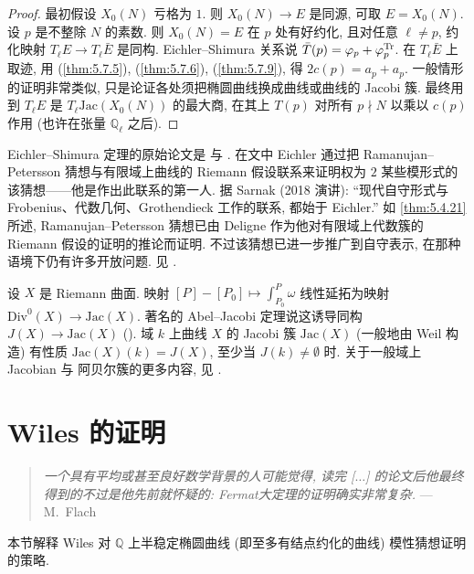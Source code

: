 \begin{proof}
最初假设 $X_0(N)$ 亏格为 $1$. 则 $X_0(N)\to E$ 是同源, 可取 $E = X_0(N)$. 设 $p$ 是不整除 $N$ 的素数. 则 $X_0(N) = E$ 在 $p$ 处有好约化, 且对任意 $\ell\neq p$, 约化映射 $T_\ell E\to T_\ell\bar{E}$ 是同构. Eichler--Shimura 关系说 $\bar{T}(p) = \varphi_p + \varphi_p^{\operatorname{Tr}}$. 在 $T_\ell\bar{E}$ 上取迹, 用 (\ref{thm:5.7.5}), (\ref{thm:5.7.6}), (\ref{thm:5.7.9}), 得 $2c(p) = a_p + a_p$. 一般情形的证明非常类似, 只是论证各处须把椭圆曲线换成曲线或曲线的 Jacobi 簇. 最终用到 $T_\ell E$ 是 $T_\ell\mathrm{Jac}(X_0(N))$ 的最大商, 在其上 $T(p)$ 对所有 $p\nmid N$ 以乘以 $c(p)$ 作用 (也许在张量 $\mathbb{Q}_\ell$ 之后).
\end{proof}

\begin{aside} \label{thm:5.7.11} 
Eichler--Shimura 定理的原始论文是 \cite{eichler1954} 与 \cite{shimura1958}. 在文中 Eichler 通过把 Ramanujan--Petersson 猜想与有限域上曲线的 Riemann 假设联系来证明权为 $2$ 某些模形式的该猜想——他是作出此联系的第一人. 据 Sarnak (2018 演讲): ``现代自守形式与 Frobenius、代数几何、Grothendieck 工作的联系, 都始于 Eichler.''
如 \ref{thm:5.4.21} 所述, Ramanujan--Petersson 猜想已由 Deligne 作为他对有限域上代数簇的 Riemann 假设的证明的推论而证明. 不过该猜想已进一步推广到自守表示, 在那种语境下仍有许多开放问题. 见 \cite{sarnak2005}.
\end{aside}

\begin{aside} \label{thm:5.7.12} 
设 $X$ 是 Riemann 曲面. 映射 $[P]-[P_0]\mapsto\int_{P_0}^{P}\omega$ 线性延拓为映射 $\mathrm{Div}^0(X)\to\mathrm{Jac}(X)$. 著名的 Abel--Jacobi 定理说这诱导同构 $J(X)\to\mathrm{Jac}(X)$ (\cite[21d]{fulton1995}). 域 $k$ 上曲线 $X$ 的 Jacobi 簇 $\mathrm{Jac}(X)$ (一般地由 Weil 构造) 有性质 $\mathrm{Jac}(X)(k) = J(X)$, 至少当 $J(k)\neq\emptyset$ 时. 关于一般域上 Jacobian 与 阿贝尔簇的更多内容, 见 \cite{milne1986a, milne1986b}.
\end{aside}

\section{Wiles 的证明}\label{sec:5.8}

\begin{quote}
\textit{一个具有平均或甚至良好数学背景的人可能觉得, 读完 [$\dots$] 的论文后他最终得到的不过是他先前就怀疑的: Fermat大定理的证明确实非常复杂.} \hfill --- M.\ Flach
\end{quote}

本节解释 Wiles 对 $\mathbb{Q}$ 上半稳定椭圆曲线 (即至多有结点约化的曲线) 模性猜想证明的策略.

